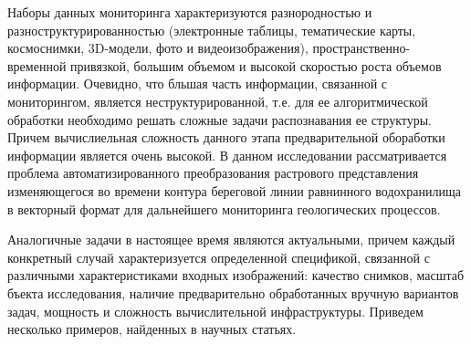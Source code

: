 \documentclass[732,fontsize=14pt,final]{studrep}
\begin{document}
Наборы данных мониторинга характеризуются разнородностью и разноструктурированностью (электронные таблицы, тематические карты, космоснимки, 3D-модели, фото и видеоизображения), пространственно-временной привязкой, большим объемом и высокой скоростью роста объемов информации. Очевидно, что бльшая часть информации, связанной с мониторингом, является неструктурированной, т.е. для ее алгоритмической обработки необходимо решать сложные задачи распознавания ее структуры. Причем вычислиельная сложность данного этапа предварительной обоработки информации является очень высокой.  В данном исследовании рассматривается проблема автоматизированного преобразования растрового представления изменяющегося во времени контура береговой линии равнинного водохранилища в векторный формат для дальнейшего мониторинга геологических процессов.

Аналогичные задачи в настоящее время являются актуальными, причем каждый конкретный случай характеризуется определенной спецификой, связанной с различными характеристиками входных изображений: качество снимков, масштаб бъекта исследования, наличие предварительно обработанных вручную вариантов задач, мощность и сложность вычислительной инфраструктуры. Приведем несколько примеров, найденных в научных статьях. 
\end{document}
